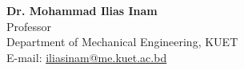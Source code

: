 \documentclass[letterpaper,11pt]{article}
\begin{document}
\begin{minipage}[t]{0.45\textwidth}
\textbf{Dr. Mohammad Ilias Inam} \\
Professor \\
Department of Mechanical Engineering, KUET \\
E-mail: \href{mailto:iliasinam@me.kuet.ac.bd}{iliasinam@me.kuet.ac.bd}
\end{minipage}
\end{document}

